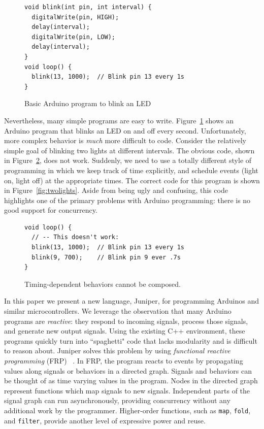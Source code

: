 \documentclass{sigplanconf}
\begin{document}
\begin{figure}[hb]
\begin{small}
\begin{verbatim}
void blink(int pin, int interval) {
  digitalWrite(pin, HIGH);
  delay(interval);
  digitalWrite(pin, LOW);
  delay(interval);
}
void loop() {
  blink(13, 1000);  // Blink pin 13 every 1s
}
\end{verbatim}
\end{small}
\caption{Basic Arduino program to blink an LED}
\label{fig:helloworld}
\end{figure}

Nevertheless, many simple programs are easy to write. Figure~\ref{fig:helloworld} shows an Arduino program that blinks an LED on and off every second. Unfortunately, more complex behavior is \textit{much} more difficult to code. Consider the relatively simple goal of blinking two lights at different intervals. The obvious code, shown in Figure~\ref{fig:badtwolights}, does not work. Suddenly, we need to use a totally different style of programming in which we keep track of time explicitly, and schedule events (light on, light off) at the appropriate times. The correct code for this program is shown in Figure~\ref{fig:twolights}. Aside from being ugly and confusing, this code highlights one of the primary problems with Arduino programming: there is no good support for concurrency.

\begin{figure}[hb]
\begin{small}
\begin{verbatim}
void loop() {
  // -- This doesn't work:
  blink(13, 1000);  // Blink pin 13 every 1s
  blink(9, 700);    // Blink pin 9 ever .7s
}
\end{verbatim}
\end{small}
\caption{Timing-dependent behaviors cannot be composed.}
\label{fig:badtwolights}
\end{figure}

\vspace{1em}

\noindent
In this paper we present a new language, Juniper, for programming Arduinos and similar microcontrollers. We leverage the observation that many Arduino programs are \textit{reactive}: they respond to incoming signals, process those signals, and generate new output signals. Using the existing C++ environment, these programs quickly turn into ``spaghetti" code that lacks modularity and is difficult to reason about. Juniper solves this problem by using \textit{functional reactive programming} (FRP) ~\cite{elm}. In FRP, the program reacts to events by propagating values along signals or behaviors in a directed graph. Signals and behaviors can be thought of as time varying values in the program. Nodes in the directed graph represent functions which map signals to new signals. Independent parts of the signal graph can run asynchronously, providing concurrency without any additional work by the programmer. Higher-order functions, such as \texttt{map}, \texttt{fold}, and \texttt{filter}, provide another level of expressive power and reuse.
\end{document}
